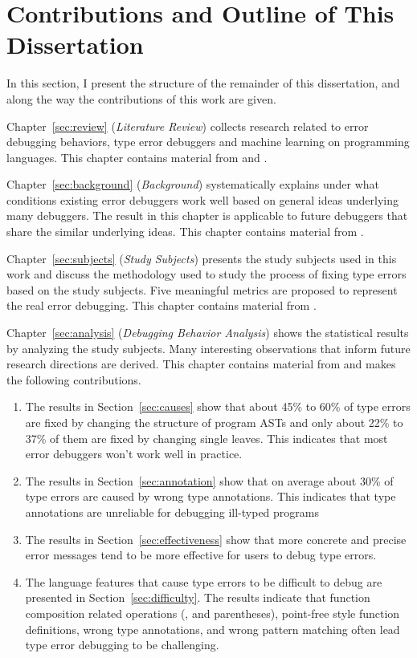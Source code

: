 \documentclass[12pt]{report}	%
\begin{document}
\section{Contributions and Outline of This Dissertation}

In this section, I present the structure of the remainder of this dissertation,
and along the way the contributions of this work are given.

Chapter~\ref{sec:review} (\emph{Literature Review}) collects research related to error debugging behaviors,  
type error debuggers and machine learning on programming languages.
This chapter contains material from \cite{wu2017type} and \cite{wu2017learning}.

Chapter~\ref{sec:background} (\emph{Background}) systematically explains under what conditions existing error debuggers work well
based on general ideas underlying many debuggers.
The result in this chapter is applicable to future debuggers that share the similar underlying ideas.
This chapter contains material from \cite{wu2017type}.

Chapter~\ref{sec:subjects} (\emph{Study Subjects}) presents the study subjects used in this work and
discuss the methodology used to study the process of fixing type errors based on the study subjects.
Five meaningful metrics are proposed to represent the real error debugging.
This chapter contains material from \cite{wu2017type}.

Chapter~\ref{sec:analysis} (\emph{Debugging Behavior Analysis}) shows the statistical results by analyzing the study subjects.
Many interesting observations that inform future research directions are derived.
This chapter contains material from \cite{wu2017type} and makes the following contributions.

\begin{enumerate}
\item The results in Section~\ref{sec:causes} show that about 45\% to 60\% of type errors are fixed by changing the structure of program ASTs 
and only about 22\% to 37\% of them are fixed by changing single leaves.
This indicates that most error debuggers won't work well in practice.

\item The results in Section~\ref{sec:annotation} show that on average about 30\% of type errors are caused by wrong type annotations.
This indicates that type annotations are unreliable for debugging ill-typed programs

\item The results in Section~\ref{sec:effectiveness} show that more concrete and precise error messages tend to be more effective for users to debug type errors.

\item The language features that cause type errors to be difficult to debug are presented in Section~\ref{sec:difficulty}.
The results indicate that function composition related operations (, \prog{\$} and parentheses),
point-free style function definitions, wrong type annotations, and wrong pattern matching often lead type error debugging to be challenging.
\end{enumerate}
\end{document}
